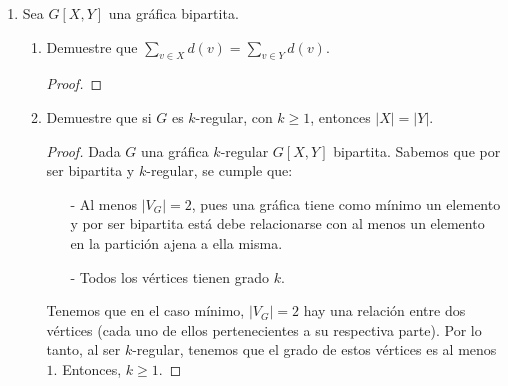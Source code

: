 \documentclass{article}
\begin{document}
\begin{enumerate}
\begin{enumerate}
\begin{proof}
      Ahora notemos que, en $Y$ están todos los subconjuntos de
      $BL_n$  que tienen cardinalidad impar. Por lo tanto, la
      diferencia simétrica en cualesquiera dos subconjuntos
      distintos en $Y$ es:
      \begin{itemize}
      \item[-] Al menos un conjunto de cardinalidad $2$.
      \end{itemize}
      Entonces tenemos que: $2k + 1 - (2k -1) = 2$ y como $Y$
      es un conjunto, no se tiene dos conjuntos iguales a los
      cuales relacionar. Por lo anterior y por la definición de
      diferencia simétrica, no existen dos conjuntos adyacentes
      en $Y$.
      
      \hspace*{3cm}  $\therefore$ \ \ \ $BL_n$ es bipartita en $X$ y $Y$, \textit{i.e.} $BL_n[X,Y]$
    \end{proof}
  \end{enumerate}
  
\item Sea $G[X, Y]$ una gr\'afica bipartita.
  \begin{enumerate}

  \item Demuestre que $\sum_{v \in X} d(v) = \sum_{v \in Y} d(v)$.
    \begin{proof}
      
    \end{proof}
    
  \item Demuestre que si $G$ es $k$-regular, con $k \ge 1$, entonces
    $|X| = |Y|$.
    \begin{proof}
      Dada $G$ una gráfica $k$-regular $G[X,Y]$ bipartita. 
      Sabemos que por ser bipartita y $k$-regular, se cumple que:
      \begin{itemize}
      \item[-] Al menos $|V_G|=2$, pues una gráfica tiene como mínimo
        un elemento y por ser bipartita está debe relacionarse con al
        menos un elemento en la partición ajena a ella misma. 
        
      \item[-] Todos los vértices tienen grado $k$.
      \end{itemize}
      Tenemos que en el caso mínimo, $|V_G| = 2$  hay una relación entre
      dos vértices (cada uno de ellos pertenecientes a su respectiva
      parte). Por lo tanto, al ser $k$-regular, tenemos que el grado
      de estos vértices es al menos $1$. Entonces, $k \geq 1$.
      

\end{proof}
\end{enumerate}
\end{enumerate}
\end{document}
